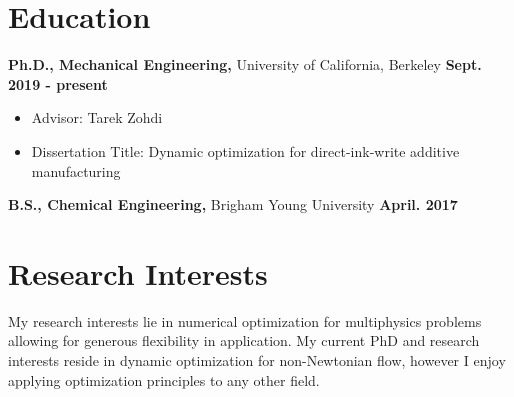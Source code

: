 \documentclass[margin,line]{res}
\begin{document}
\newcommand{\myname}{Brian Howell}
\newlength{\mynamewidth}
\settowidth{\mynamewidth}{\namefont\myname}
\name{\hspace*{0.5\textwidth}\hspace{-0.5\mynamewidth} \myname \vspace*{.1in}}
\thispagestyle{empty}

\begin{resume}



\section{\sc Education}
{\bf Ph.D., Mechanical Engineering,} University of California, Berkeley \hfill {\bf Sept. 2019 - present}\\
\vspace*{-.1in}
\begin{itemize}
	\item[ ] Advisor: Tarek Zohdi
	\item[ ] Dissertation Title: Dynamic optimization for direct-ink-write additive manufacturing
\end{itemize}


{\bf B.S., Chemical Engineering,} Brigham Young University \hfill {\bf April. 2017}\\
\vspace*{-.1in}

\section{\sc Research Interests}
My research interests lie in numerical optimization for multiphysics problems allowing for generous flexibility in application. My current PhD and research interests reside in dynamic optimization for non-Newtonian flow, however I enjoy applying optimization principles to any other field. 


\end{resume}
\end{document}
